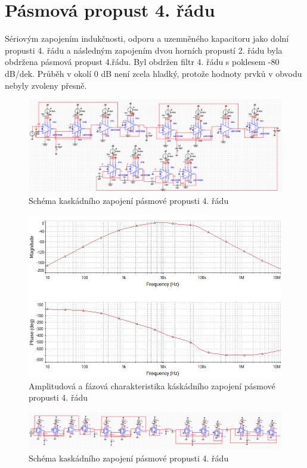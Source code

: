 \documentclass[twoside]{article}
\begin{document}
\section{Pásmová propust 4. řádu}
\noindent Sériovým zapojením indukčnosti, odporu a uzemněného kapacitoru jako dolní propusti 4. řádu a následným zapojením dvou horních propustí 2. řádu byla obdržena pásmová propust 4.řádu. Byl obdržen filtr 4. řádu s poklesem -80 dB/dek. Průběh v okolí 0 dB není zcela hladký, protože hodnoty prvků v obvodu nebyly zvoleny přesně.
\begin{figure}[H]
\centering
\includegraphics[scale=0.5]{lrcbandpass4.png}
\caption{Schéma kaskádního zapojení pásmové propusti 4. řádu}
\end{figure}
\begin{figure}[H]
\centering
\includegraphics[scale=0.6]{lrcbandpass4ampl.png}
\caption{Amplitudová a fázová charakteristika káskádního zapojení pásmové propusti 4. řádu}
\end{figure}
\begin{figure}[H]
\centering
\includegraphics[scale=0.5]{bp4sch.png}
\caption{Schéma kaskádního zapojení pásmové propusti 4. řádu}
\end{figure}
\end{document}
